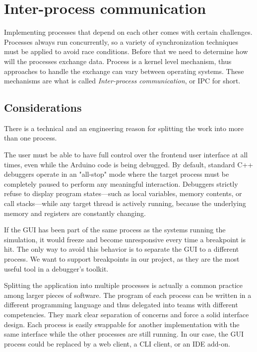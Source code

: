\section{Inter-process communication} \label{sec:ipc}

Implementing processes that depend on each other comes with certain challenges. Processes always run concurrently, so a variety of synchronization techniques must be applied to avoid race conditions. Before that we need to determine how will the processes exchange data. Process is a kernel level mechanism, thus approaches to handle the exchange can vary between operating systems. These mechanisms are what is called \textit{Inter-process communication}, or IPC for short.

\subsection{Considerations} \label{subsec:ipc_considerations}
There is a technical and an engineering reason for splitting the work into more than one process.

The user must be able to have full control over the frontend user interface at all times, even while the Arduino code is being debugged. By default, standard C++ debuggers operate in an "all-stop" mode where the target process must be completely paused to perform any meaningful interaction. Debuggers strictly refuse to display program states—such as local variables, memory contents, or call stacks—while any target thread is actively running, because the underlying memory and registers are constantly changing. 

If the GUI has been part of the same process as the systems running the simulation, it would freeze and become unresponsive every time a breakpoint is hit. The only way to avoid this behavior is to separate the GUI to a different process. We want to support breakpoints in our project, as they are the most useful tool in a debugger's toolkit.

Splitting the application into multiple processes is actually a common practice among larger pieces of software. The program of each process can be written in a different programming language and thus delegated into teams with different competencies. They mark clear separation of concerns and force a solid interface design. Each process is easily swappable for another implementation with the same interface while the other processes are still running. In our case, the GUI process could be replaced by a web client, a CLI client, or an IDE add-on.

